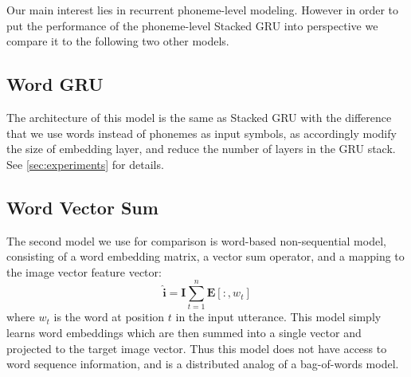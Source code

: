 Our main interest lies in  recurrent phoneme-level modeling. However in order to
put the performance of the phoneme-level {\sc Stacked GRU} into
perspective we compare it to the following two other models.


\subsection{Word GRU}
The architecture of this model is the same as {\sc Stacked GRU} with
the difference that we use words instead of phonemes as input symbols,
as accordingly modify the size of embedding layer, and reduce the
number of layers in the GRU stack. See
\ref{sec:experiments} for details.
\subsection{Word Vector Sum}
The second model we use for comparison is word-based non-sequential
model, consisting of a word embedding matrix, a vector sum operator,
and a mapping to the image vector feature vector:
\begin{equation}
  \label{eq:sum}
  \hat{\mathbf{i}} = \mathbf{I} \sum_{t=1}^n \mathbf{E}[:,w_t]
\end{equation}
where $w_t$ is the word at position $t$ in the input utterance.
This model simply learns word embeddings which are then summed into a
single vector and projected to the target image vector. Thus this model does
not have access to word sequence information, and is a distributed
analog of a bag-of-words model.
